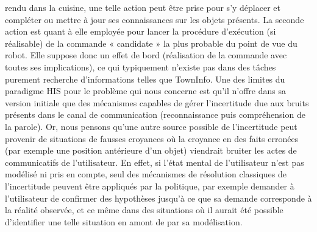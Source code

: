 \documentclass[a4paper,11pt,twoside]{StyleThese}
\begin{document}
rendu dans la cuisine, une telle action peut être prise pour s’y déplacer et compléter ou
mettre à jour ses connaissances sur les objets présents. La seconde action est quant à elle
employée pour lancer la procédure d’exécution (si réalisable) de la commande « candidate
» la plus probable du point de vue du robot. Elle suppose donc un effet de bord
(réalisation de la commande avec toutes ses implications), ce qui typiquement n’existe
pas dans des tâches purement recherche d’informations telles que TownInfo.
Une des limites du paradigme HIS pour le problème qui nous concerne est qu’il
n’offre dans sa version initiale que des mécanismes capables de gérer l’incertitude due
aux bruits présents dans le canal de communication (reconnaissance puis compréhension
de la parole). Or, nous pensons qu’une autre source possible de l’incertitude peut
provenir de situations de fausses croyances où la croyance en des faits erronées (par
exemple une position antérieure d’un objet) viendrait bruiter les actes de communicatifs
de l’utilisateur. En effet, si l’état mental de l’utilisateur n’est pas modélisé ni pris
en compte, seul des mécanismes de résolution classiques de l’incertitude peuvent être
appliqués par la politique, par exemple demander à l’utilisateur de confirmer des hypothèses
jusqu’à ce que sa demande corresponde à la réalité observée, et ce même dans
des situations où il aurait été possible d’identifier une telle situation en amont de par
sa modélisation.
\end{document}
